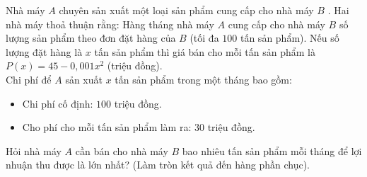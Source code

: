  \begin{ex}%
 Nhà máy $A$ chuyên sản xuất một loại sản phẩm cung cấp cho nhà máy $B$ . Hai nhà máy thoả thuận rằng: Hàng tháng nhà máy $A$ cung cấp cho nhà máy $B$ số lượng sản phẩm theo đơn đặt hàng của $B$ (tối đa $100$ tấn sản phẩm). Nếu số lượng đặt hàng là $x$ tấn sản phẩm thì giá bán cho mỗi tấn sản phẩm là $P(x)=45-0,001x^2$ (triệu đồng).\\
 Chi phí để $A$ sản xuất $x$ tấn sản phẩm trong một tháng bao gồm:
 \begin{itemize}
    \item Chi phí cố định: $100$ triệu đồng.
   \item  Cho phí cho mỗi tấn sản phẩm làm ra: $30$ triệu đồng.
 \end{itemize}
 Hỏi nhà máy $A$ cần bán cho nhà máy $B$ bao nhiêu tấn sản phẩm mỗi tháng để lợi nhuận thu được là lớn nhất? (Làm tròn kết quả đến hàng phần chục).
 \end{ex}
 
